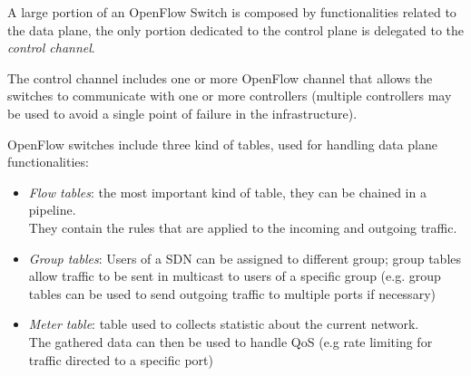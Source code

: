 A large portion of an OpenFlow Switch is composed by functionalities related to the data plane, the only portion dedicated to the control plane is delegated to the \textit{control channel}.

The control channel includes one or more OpenFlow channel that allows the switches to communicate with one or more controllers (multiple controllers may be used to avoid a single point of failure in the infrastructure).
 
OpenFlow switches include three kind of tables, used for handling data plane functionalities:

\begin{itemize}
	\item \textit{Flow tables}: the most important kind of table, they can be chained in a pipeline. \\
	They contain the rules that are applied to the incoming and outgoing traffic.
	\item \textit{Group tables}: Users of a SDN can be assigned to different group; group tables allow traffic to be sent in multicast to users of a specific group (e.g. group tables can be used to send outgoing traffic to multiple ports if necessary)
	\item \textit{Meter table}: table used to collects statistic about the current network. \\
	The gathered data can then be used to handle QoS (e.g rate limiting for traffic directed to a specific port)
\end{itemize}

